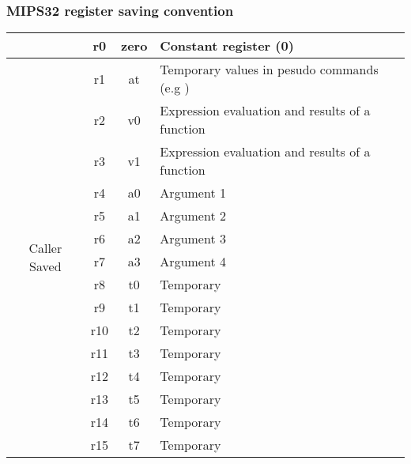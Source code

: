 \documentclass{report}
\begin{document}
\subsubsection*{MIPS32 register saving convention}
\begin{center}
	\begin{tabular}{c c c l}
		                               & r0  & zero     & Constant register (0)                               \\
		\hline
		\multirow{15}{*}{Caller Saved} & r1  & at       & Temporary values in pesudo commands (e.g \fun{slt}) \\
		                               & r2  & v0       & Expression evaluation and results of a function     \\
		                               & r3  & v1       & Expression evaluation and results of a function     \\
		                               & r4  & a0       & Argument 1                                          \\
		                               & r5  & a1       & Argument 2                                          \\
		                               & r6  & a2       & Argument 3                                          \\
		                               & r7  & a3       & Argument 4                                          \\
		                               & r8  & t0       & Temporary                                           \\
		                               & r9  & t1       & Temporary                                           \\
		                               & r10 & t2       & Temporary                                           \\
		                               & r11 & t3       & Temporary                                           \\
		                               & r12 & t4       & Temporary                                           \\
		                               & r13 & t5       & Temporary                                           \\
		                               & r14 & t6       & Temporary                                           \\
		                               & r15 & t7       & Temporary                                           \\

\end{tabular}
\end{center}
\end{document}

